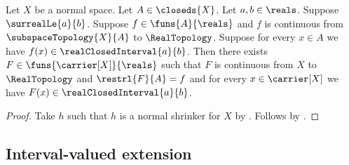 \begin{theorem}\label{tietze_extension_closed_interval_real}
    Let $X$ be a normal space.
    Let $A\in\closeds{X}$.
    Let $a,b\in\reals$.
    Suppose $\surrealLe{a}{b}$.
    Suppose $f\in\funs{A}{\reals}$ and $f$ is continuous from
        $\subspaceTopology{X}{A}$ to $\RealTopology$.
    Suppose for every $x\in A$ we have
        $f(x)\in\realClosedInterval{a}{b}$.
    Then there exists $F\in\funs{\carrier[X]}{\reals}$ such that
        $F$ is continuous from $X$ to $\RealTopology$ and
        $\restrl{F}{A}=f$ and
        for every $x\in\carrier[X]$ we have
            $F(x)\in\realClosedInterval{a}{b}$.
\end{theorem}
\begin{proof}
    Take $h$ such that $h$ is a normal shrinker for $X$
        by .
    Follows by
        .
\end{proof}

\subsection{Interval-valued extension}

